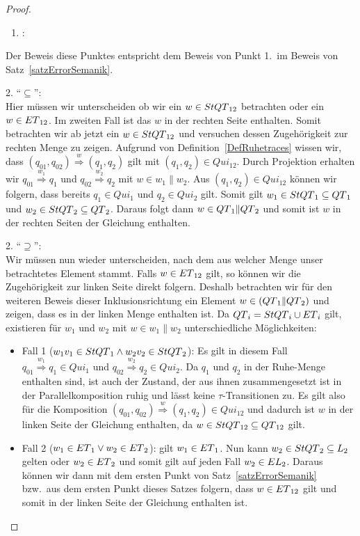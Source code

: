 \begin{proof}
  ~
  \begin{enumerate}
    \item \hspace{-0.2cm}:
  \end{enumerate}
  \vspace{-0.3cm}
  Der Beweis diese Punktes entspricht dem Beweis von Punkt 1.\ im Beweis von
  Satz~\ref{satzErrorSemanik}.

  2. ``$\subseteq$'':\\
  Hier müssen wir unterscheiden ob wir ein $w\in StQT{}_{12}$ betrachten oder
  ein $w\in ET{}_{12}$. Im zweiten Fall ist das $w$ in der rechten Seite
  enthalten. Somit betrachten wir ab jetzt ein
  $w\in StQT{}_{12}$ und versuchen dessen Zugehörigkeit zur rechten Menge zu
  zeigen. Aufgrund von Definition~\ref{DefRuhetraces} wissen wir, dass
  $(q_{01},q_{02}) \overset{w}{\Rightarrow} (q_1,q_2)$ gilt mit $(q_1,q_2)\in
  Qui_{12}$. Durch Projektion erhalten wir $q_{01} \overset{w_1}{\Rightarrow}
  q_1$ und $q_{02} \overset{w_2}{\Rightarrow} q_2$ mit $w\in w_1\|w_2$. Aus
  $(q_1,q_2)\in Qui_{12}$ können wir folgern, dass bereits $q_1\in Qui_1$ und
  $q_2\in Qui_2$ gilt. Somit gilt $w_1\in StQT{}_1\subseteq QT{}_1$ und
  $w_2\in StQT{}_2\subseteq QT{}_2$. Daraus folgt dann $w\in
  QT{}_1\|QT{}_2$ und somit ist $w$ in der rechten Seiten der Gleichung
  enthalten.

  2. ``$\supseteq$'':\\
  Wir müssen nun wieder unterscheiden, nach dem aus welcher Menge unser
  betrachtetes Element stammt. Falls $w\in ET{}_{12}$ gilt, so können wir die
  Zugehörigkeit zur linken Seite direkt folgern. Deshalb betrachten wir für den
  weiteren Beweis dieser Inklusionsrichtung ein Element $w\in
  (QT{}_1\|QT{}_2)$ und zeigen, dass es in der linken Menge enthalten ist. Da
  $QT{}_i = StQT{}_i\cup ET{}_i$ gilt, existieren für $w_1$ und $w_2$ mit
  $w\in w_1\| w_2$ unterschiedliche Möglichkeiten:
  \begin{itemize}
    \item Fall 1 ($w_1v_1\in StQT{}_1\wedge w_2v_2\in StQT{}_2$): Es gilt in
      diesem Fall $q_{01} \overset{w_1}{\Rightarrow} q_1\in Qui_1$ und $q_{02}
      \overset{w_2}{\Rightarrow} q_2\in Qui_2$. Da $q_1$ und $q_2$ in der
      Ruhe-Menge enthalten sind, ist auch der Zustand, der aus ihnen
      zusammengesetzt ist in der Parallelkomposition ruhig und lässt keine
      $\tau$-Transitionen zu. Es gilt also für die Komposition $(q_{01},q_{02})
      \overset{w}{\Rightarrow} (q_1,q_2)\in Qui_{12}$ und dadurch ist $w$ in
      der linken Seite der Gleichung enthalten, da $w\in StQT{}_{12}\subseteq
      QT{}_{12}$ gilt.
    \item Fall 2 ($w_1\in ET{}_1\vee w_2\in ET{}_2$): \OBdA{} gilt
      $w_1\in ET{}_1$. Nun kann $w_2\in StQT{}_2\subseteq L_2$ gelten
      oder $w_2\in ET{}_2$ und somit gilt auf jeden Fall $w_2\in
      EL{}_2$. Daraus können wir dann mit dem ersten Punkt von
      Satz~\ref{satzErrorSemanik} bzw.\ aus dem ersten Punkt dieses Satzes
      folgern, dass $w\in ET{}_{12}$ gilt und somit in der linken Seite der
      Gleichung enthalten ist.
  \end{itemize}


\end{proof}
